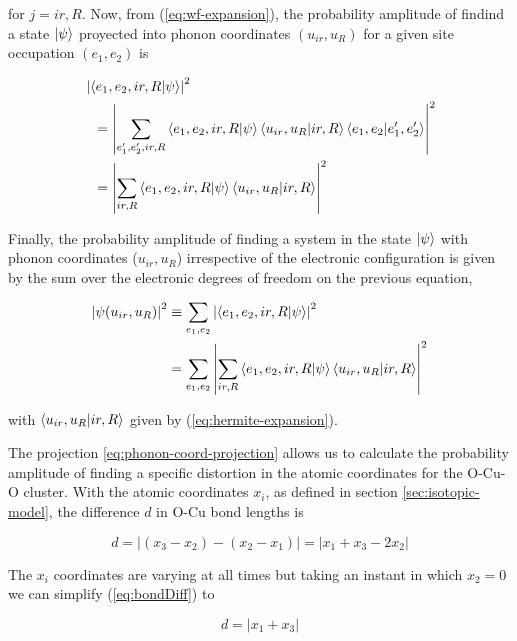 \noindent for $j=ir,R$. 
Now, from (\ref{eq:wf-expansion}), the probability amplitude of findind a state $\left | \psi \right\rangle$ proyected into phonon coordinates $(u_{ir},u_R)$ for a given site occupation $(e_1,e_2)$ is

\begin{equation}
\begin{split}
& \left|\left\langle e_1,e_2,ir,R|\psi\right\rangle\right|^2 \\
& \ \ = \left|\sum_{e_1',e_2',ir,R}\left\langle e_1,e_2,ir,R|\psi\right\rangle\left\langle u_{ir},u_R|ir,R\right\rangle\left\langle e_1,e_2|e_1',e_2'\right\rangle\right|^2 \\
& \ \ = \left|\sum_{ir,R}\left\langle e_1,e_2,ir,R|\psi\right\rangle\left\langle u_{ir},u_R|ir,R\right\rangle\right|^2
\end{split}
\end{equation}

Finally, the probability amplitude of finding a system in the state $\left | \psi \right\rangle$ with phonon coordinates ($u_{ir},u_R$) irrespective of the electronic configuration is given by the sum over the electronic degrees of freedom on the previous equation,

\begin{equation}\label{eq:phonon-coord-projection}
\begin{split} \left|\psi(u_{ir}, u_R)\right|^2 & \equiv \sum_{e_1,e_2}\left|\left\langle e_1,e_2,ir,R|\psi\right\rangle\right|^2 \\
& = \sum_{e_1,e_2} \left|\sum_{ir,R}\left\langle e_1,e_2,ir,R|\psi\right\rangle\left\langle u_{ir},u_R|ir,R\right\rangle\right|^2
\end{split}
\end{equation}

\noindent with $\left\langle u_{ir},u_R|ir,R\right\rangle$ given by (\ref{eq:hermite-expansion}).

The projection \ref{eq:phonon-coord-projection} allows us to calculate the probability amplitude of finding a specific distortion in the atomic coordinates for the O-Cu-O cluster.
With the atomic coordinates $x_i$, as defined in section \ref{sec:isotopic-model}, the difference $d$ in O-Cu bond lengths is

\begin{equation}\label{eq:bondDiff}
d= \left| (x_3 - x_2) - (x_2 - x_1) \right| = \left| x_1 + x_3 - 2x_2 \right|
\end{equation}

The $x_i$ coordinates are varying at all times but taking an instant in which $x_2=0$ we can simplify (\ref{eq:bondDiff}) to

\begin{equation}\label{eq:bondDiffSimpl}
d=\left|x_1+x_3\right|
\end{equation}

